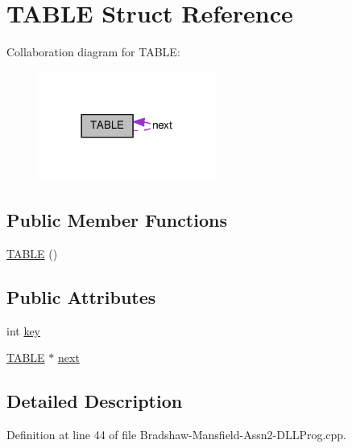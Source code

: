 \hypertarget{struct_t_a_b_l_e}{
\section{TABLE Struct Reference}
\label{struct_t_a_b_l_e}
}


Collaboration diagram for TABLE:\nopagebreak
\begin{figure}[H]
\begin{center}
\leavevmode
\includegraphics[width=165pt]{struct_t_a_b_l_e__coll__graph}
\end{center}
\end{figure}
\subsection*{Public Member Functions}
\begin{DoxyCompactItemize}
\item 
\hyperlink{struct_t_a_b_l_e_a34ca35df0c02a42a2667b918ac8949b9}{TABLE} ()
\end{DoxyCompactItemize}
\subsection*{Public Attributes}
\begin{DoxyCompactItemize}
\item 
int \hyperlink{struct_t_a_b_l_e_aca8b660b95cd57c4ac1985b870651ce6}{key}
\item 
\hyperlink{struct_t_a_b_l_e}{TABLE} $\ast$ \hyperlink{struct_t_a_b_l_e_a9a6386994116363347f6a485410c4f02}{next}
\end{DoxyCompactItemize}


\subsection{Detailed Description}


Definition at line 44 of file Bradshaw-\/Mansfield-\/Assn2-\/DLLProg.cpp.



